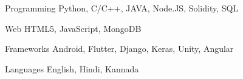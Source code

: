 


\begin{cvskills}


\cvskill
{Programming} %
{Python, C/C++, JAVA, Node.JS, Solidity, SQL} %


\cvskill
{Web} %
{HTML5, JavaScript, MongoDB} %


\cvskill
{Frameworks} %
{Android, Flutter, Django, Keras, Unity, Angular} %


\cvskill
{Languages} %
{English, Hindi, Kannada} %


\end{cvskills}